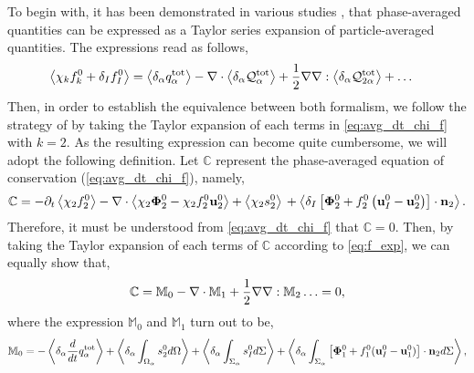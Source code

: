 To begin with, it has been demonstrated in various studies \citep{nott2011suspension,jackson1997locally,zhang1994averaged}, that phase-averaged quantities can be expressed as a Taylor series expansion of particle-averaged quantities. 
The expressions read as follows, 
\begin{align}
    \left<\chi_kf_k^0 + \delta_I f_I^0\right> 
    &=  \left<\delta_\alpha q_\alpha^\text{tot}\right>
        - \mathbf{\nabla}\cdot  
        \left<\delta_\alpha \mathcal{Q}_\alpha^\text{tot}\right>        
        + \frac{1}{2} \mathbf{\nabla}\mathbf{\nabla} : \left<\delta_\alpha \mathcal{Q}_{2\alpha}^{\text{tot}}\right>
        + \ldots  
    \label{eq:f_exp}
\end{align}
Then, in order to establish the equivalence between both formalism, we follow the strategy of \citep{lhuillier2000bilan} by taking the Taylor expansion of each terms in \ref{eq:avg_dt_chi_f} with $k=2$. 
As the resulting expression can become quite cumbersome, we will adopt the following definition. 
Let $\mathbb{C}$ represent the phase-averaged equation of conservation (\ref{eq:avg_dt_chi_f}), namely, 
\begin{equation*}
    \mathbb{C}
    =
    - \partial_t \left<\chi_2f_2^0\right>
    - \mathbf{\nabla}\cdot \left<\chi_2 \mathbf{\Phi}_2^0 - \chi_2f_2^0 \textbf{u}_2^0\right>
    + \left<\chi_2 s_2^0\right>\\
    + \left<\delta_I\left[
        \mathbf{\Phi}_2^0
        + f_2^0
        \left(
            \textbf{u}_I^0
            - \textbf{u}_2^0
        \right)
    \right]
    \cdot \textbf{n}_2\right>. 
\end{equation*}
Therefore, it must be understood from \ref{eq:avg_dt_chi_f} that $\mathbb{C}=0$.
Then, by taking the Taylor expansion of each terms of $\mathbb{C}$ according to \ref{eq:f_exp}, we can equally show that,
\begin{equation}
    \mathbb{C} = \mathbb{M}_0 - \mathbf{\nabla}\cdot \mathbb{M}_1 + \frac{1}{2} \mathbf{\nabla}\mathbf{\nabla} : \mathbb{M}_2 \ldots = 0,
    \label{eq:scheme_equivalence}
\end{equation} 
where the expression $\mathbb{M}_0$ and $\mathbb{M}_1$ turn out to be, 
\begin{multline*}
    \mathbb{M}_0
    = 
    - \left<\delta_\alpha \frac{d}{d t} q_\alpha^\text{tot}\right>
    + \left<\delta_\alpha\int_{\Omega_\alpha} s_2^0 d\Omega\right>
    + \left<\delta_\alpha\int_{\Sigma_\alpha} s_I^0 d\Sigma\right>
    + \left<\delta_\alpha\int_{\Sigma_\alpha} 
    \left[\mathbf{\Phi}_1^0 
    + f_1^0 (\textbf{u}_I^0-\textbf{u}_1^0) \right] \cdot \textbf{n}_2 d\Sigma\right>,
\end{multline*}
